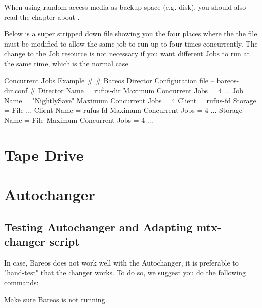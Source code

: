 When using random access media as backup space (e.g. disk), you should also read the chapter about .

Below is a super stripped down  file showing you the four
places where the the file must be modified to allow the same job  
to run up to four times concurrently. The change to the Job
resource is not necessary if you want different Jobs to run at the same time,
which is the normal case. 

\begin{bconfig}{Concurrent Jobs Example}
#
# Bareos Director Configuration file -- bareos-dir.conf
#
Director {
  Name = rufus-dir
  Maximum Concurrent Jobs = 4
  ...
}
Job {
  Name = "NightlySave"
  Maximum Concurrent Jobs = 4
  Client = rufus-fd
  Storage = File
  ...
}
Client {
  Name = rufus-fd
  Maximum Concurrent Jobs = 4
  ...
}
Storage {
  Name = File
  Maximum Concurrent Jobs = 4
  ...
}
\end{bconfig}




\section{Tape Drive}
\label{TapeTestingChapter}



\section{Autochanger}

\subsection{Testing Autochanger and Adapting mtx-changer script}
\label{AutochangerTesting}

In case, Bareos does not work well with the Autochanger,
it is preferable to
"hand-test" that the changer works. To do so, we suggest you do the
following commands:

Make sure Bareos is not running.


